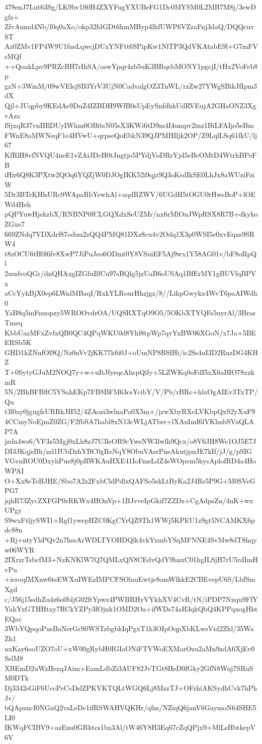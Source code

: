 478enJ7Lut63Sg/LK9bv1S0H4ZXYFugYXUBeFG1Dc0MYSM0L2MB7M8j/3ewDgfz+
ZfvAumd4Nb/l0q0aXo/okp32fdGDt6hmMByp4lhfUWP6VZzaFnj3daQ/DQQcuvST
Az0ZMv1FP4W9U1fueLqwcjDUxYNFtt6SPipKw1NlTP3QdVKAtabE9l+G7mFVsMQf
++QoakLpv9PRZcBH7rIhSA/oswYpqr4zb5uK3BRqebMONY1pgcjI/tHx2VoFeb8p
gzN+3WmM/09wVElsjSB3YrV3UjN0CadvalgOZ3TnWL/rzZw27YWgSBikJfIpm3dX
Qjl+JUqpby9KEdAe9DuZ4IZBDH9WfB0sUpEySnfdhkUdRVEujA2GHaONZ3XgvAzx
fSjxqR37vnIHlDUyIWhm0OBitsN05sX3KWi6tD9m4I4umpv2inz1BiLFAIjo5eBm
FWnE8aMWNeqF1e4HVwU+qrpseQoEbkN39QJPMHIljk2OP/Z9LqlLSq61fkU/lj67
KfRlH8vfNVQU4neE1vZAiJDcH0tJngtjo5PYdjVoDRrYjd5eBcOMtD4WtrhBPeFB
iHir6Q8K3PXtw2QOq6YQZjW0DJOgIKK52i9qjz9Q3oKsdIkSE0LhJx8aWUziFziW
5Dr3BTrKHlsURc9WApaRbYewhAl+aqdRZWV/6UGdH5tOGU0tHwsBoP+lOEWd4Heh
pQPYuwHjekzbX/RNBNP0fCLGQXdxSeUZMr/nx6rMlOuJWpRSX8R7B+dkykoZGxe7
669ZNdq7VDXdrf87oduu2zQQ4PMQ81DXz8cu4v2Odq1X3p0WSI5e0xvEqxs9SRW4
t8zOCU6tH0l6fv8XwP7JiPuJeo6ODmt0Y8VSuiEF5Aj9wx1Y58AG01v/bF8oRpQl
2uudvoQGr/dnQHAxgIZGfuIlfCu97sBQlg5jzUaB6oUSAq1BfErMY1gBUVfqBPVx
aCcYyhBjX0ep6LWnlMBaqI/RxkYLRourHhzjgz/8//LikpGwykx4WvT6paAIWdh0
YaB8q5inFnuopzy5WROOvdrOA/UQSRXTqO9O5/5OKbXTYQFs5uyrAl/3BrasTmeq
KbbUazMFxZvfxQB0QC4QPqWKU0d8Yhl8tpWp7qvYxBW06XGoN/x7Ja+5BEERSb5K
GHD1kZNnfOl9Q/Nz0nVv2jKK77k6i0J+oUmNP8BSfHi/ic2Ss4uI3D2RnzDG4KHZ
T+0SytyGJuM2NOQ7y+w+uItJfyeqcAhspQify+5LZWKq0oFdI5xX6aBIO78xzkmR
5N/2BhBFBflC5YSahEKp7FB8BFM63csYcibY/V/Pb/rBRc+hlaOgAIEv3TxTP/Qu
t3l0ay0jgugfsURRkJH52/4ZAozi3wlnaPa0X5m+/jzwXbyRXeLVKbpQxS2yXuF9
4CCmyNoEjmZ0ZG/F2fbSA7habl8xN13cWLjATbrr+lXAuImI6lVKhnbSVaQLAP7A
jzdn4ws6/VF3z5Mgj0xLh8zJ7U3leOR9cYweNW3lwlh9Qcx/o8V6JH8We1OJ5E7J
DI3JKqjsBh/nd1IUbDzhYBC0gReNqY8ObuVAsrPnsAkutjpnJE7kIf/jJ/g/pSIG
VGvnROU0DxyhPue8j0pRWKAuHXE41IoFmsLdZ4sWOpem5kysAplofRD4a4HoWPAI
O+Xx8eTeBJHE/Sbo7A2z2FxbCldPdlxQAFSo5skLtByKa2J4Rs5P9G+M0SVeGPG7
jqhR73ZycZXFGP0rRKWx4HOnVp+1BJvveIpGkif7ZZDz+CgAdpsZn/4nK+wxUPgy
S9wxFtljySWI1+Rgf1ywepHZC0KgCYrQZ9Th1WWj5KPEU1z9gt5NCAMKX6pdc88n
+Rj+ntyYhPQv2n7hssArWDLTYOHDQlk4vkYxmbYSqMFNNE4SvMw8dT8hqyw06WYR
2IXrzrTsbcfM3+NzKNKlW7Q7QMLxQN8CEdvQdY9hnxC01hgILSjH7rU5rdImHvPu
+ieroqfMXnw6tsEWXuIWEzIMPCFSOlauEwtje8omWlkkE2CBEvepU6S/LbfSmXgd
c/J56j15sdhZu4z6o0bljG02ftYpwz4PWBRHyVYkhXV4CvR/tN/iPDP7Nxqu9FfY
YahYxGTHHtxy7RCkYZPy3fOjnk1OMD2Oa+ifWDs74aH3qkQbQ4KPPqxogHhtEQav
3WbYQpqoPusBaNerGrS0WSTzbgbkIqPgxT1k3OIpOqpXbKLwsVid2Zhl/35WaZh1
nxKay6ooUZO7oU+xW00gRybH0IGIaONiFTVWoEXMarOzu2aMn9zdA6XjEv0SslM8
XBEmD2uWzHezqJAim+EamLdbZi3AUF82JvTGt8HeD0fGky2GfN8Wuj7SRuSM0DTk
Dj3342sGiF6UccPeCeDslZPKVKTQLtWGQ6Lj8MzzTJ+OFzhiAKSydhCvk7hPhJv/
bQApzncI0NGnQ2vaLeDc1ifRSWAHVQKHr/qfm/NZiqQ6janV6GaymoN64SHE5LI0
IKWqFCIBV9+azEnu0GRktcs1bx3Al/tW46Y8H3Eq67cZqQPjx9+MlLsHbtkepV6V

